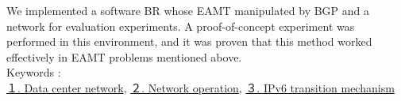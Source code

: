 We implemented a software BR whose EAMT manipulated by BGP and a network for evaluation experiments. A proof-of-concept experiment was performed in this environment, and it was proven that this method worked effectively in EAMT problems mentioned above.
~ \\

Keywords : \\
\underline{１. Data center network},
\underline{２. Network operation},
\underline{３. IPv6 transition mechanism}
\begin{flushright}
\edept \\
\eauthor
\end{flushright}
